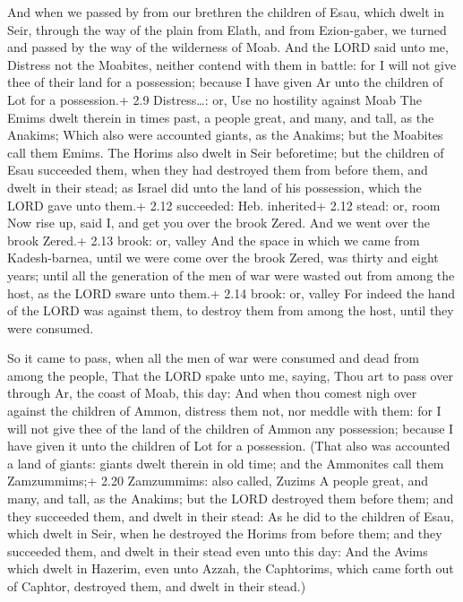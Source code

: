 And when we passed by from our brethren the children of
Esau, which dwelt in Seir, through the way of the plain from Elath, and
from Ezion-gaber, we turned and passed by the way of the wilderness of
Moab.  And the LORD said unto me, Distress not the Moabites,
neither contend with them in battle: for I will not give thee of their
land for a possession; because I have given Ar unto the children of Lot
for a possession.+ 2.9 Distress\ldots: or, Use no hostility against Moab
 The Emims dwelt therein in times past, a people great, and
many, and tall, as the Anakims;  Which also were accounted
giants, as the Anakims; but the Moabites call them Emims. 
The Horims also dwelt in Seir beforetime; but the children of Esau
succeeded them, when they had destroyed them from before them, and dwelt
in their stead; as Israel did unto the land of his possession, which the
LORD gave unto them.+ 2.12 succeeded: Heb. inherited+ 2.12 stead: or,
room  Now rise up, said I, and get you over the brook
Zered. And we went over the brook Zered.+ 2.13 brook: or, valley
 And the space in which we came from Kadesh-barnea, until
we were come over the brook Zered, was thirty and eight years; until all
the generation of the men of war were wasted out from among the host, as
the LORD sware unto them.+ 2.14 brook: or, valley  For
indeed the hand of the LORD was against them, to destroy them from among
the host, until they were consumed.

 So it came to pass, when all the men of war were
consumed and dead from among the people,  That the LORD
spake unto me, saying,  Thou art to pass over through Ar,
the coast of Moab, this day:  And when thou comest nigh
over against the children of Ammon, distress them not, nor meddle with
them: for I will not give thee of the land of the children of Ammon any
possession; because I have given it unto the children of Lot for a
possession.  (That also was accounted a land of giants:
giants dwelt therein in old time; and the Ammonites call them
Zamzummims;+ 2.20 Zamzummims: also called, Zuzims  A people
great, and many, and tall, as the Anakims; but the LORD destroyed them
before them; and they succeeded them, and dwelt in their stead:
 As he did to the children of Esau, which dwelt in Seir,
when he destroyed the Horims from before them; and they succeeded them,
and dwelt in their stead even unto this day:  And the Avims
which dwelt in Hazerim, even unto Azzah, the Caphtorims, which came
forth out of Caphtor, destroyed them, and dwelt in their stead.)

